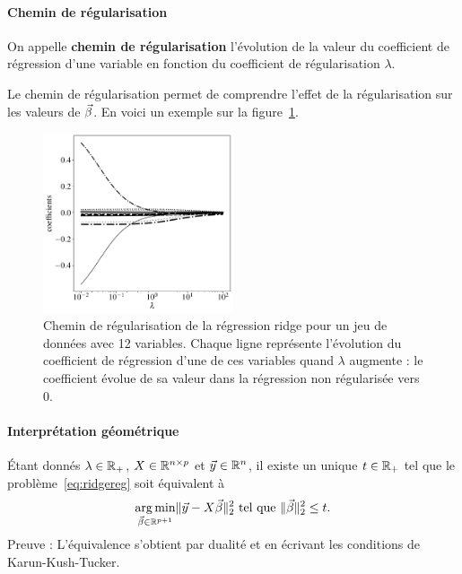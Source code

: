 
\paragraph{Chemin de régularisation}
On appelle \textbf{chemin de régularisation} l'évolution de la valeur du
coefficient de régression d'une variable en fonction du coefficient de
régularisation $\lambda$.

Le chemin de régularisation permet de comprendre l'effet de la régularisation
sur les valeurs de $\bbeta$. En voici un exemple sur la
figure~\ref{fig:ridge_path}.

\begin{figure}[h]
  \centering
  \includegraphics[width=0.5\textwidth]{figures/generalisation/ridge_path}
  \caption{Chemin de régularisation de la régression ridge pour un jeu de
    données avec 12 variables. Chaque ligne représente l'évolution du
    coefficient de régression d'une de ces variables quand $\lambda$ augmente :
    le coefficient évolue de sa valeur dans la régression non régularisée vers
    0.}
  \label{fig:ridge_path}
\end{figure}

\paragraph{Interprétation géométrique}
Étant donnés $\lambda \in \mathbb{R}_+$, $X \in \mathbb{R}^{n \times p}$ et $\yy \in \RR^n$,
il existe un unique $t \in \mathbb{R}_+$ tel que le problème~\eqref{eq:ridgereg} soit
équivalent à
\begin{equation}
  \label{eq:ridgereg_dual}
  \argmin_{\bbeta \in \RR^{p+1}} \ltwonorm{\yy - X \bbeta}^2 \text{ tel que }
  \ltwonorm{\bbeta}^2 \leq t.
\end{equation}
Preuve : L'équivalence s'obtient par dualité et en écrivant les conditions de
Karun-Kush-Tucker.
  
